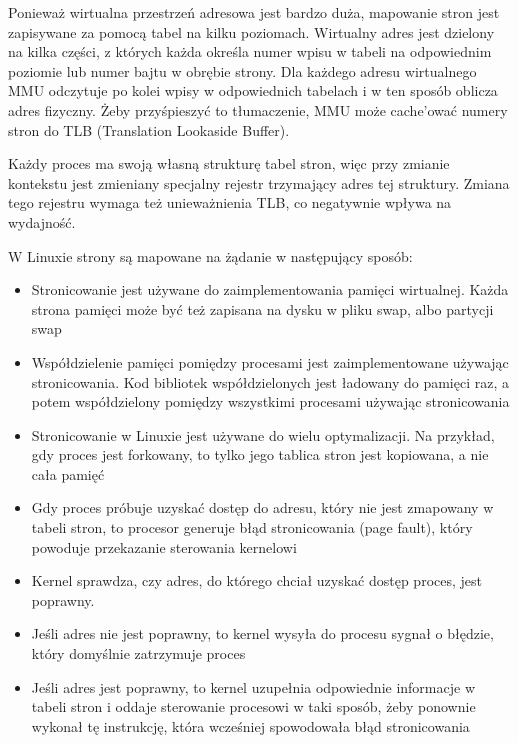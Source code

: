 Ponieważ wirtualna przestrzeń adresowa jest bardzo duża, mapowanie stron jest zapisywane za pomocą tabel na kilku poziomach. Wirtualny adres jest dzielony na kilka części, z których każda określa numer wpisu w tabeli na odpowiednim poziomie lub numer bajtu w obrębie strony. Dla każdego adresu wirtualnego MMU odczytuje po kolei wpisy w odpowiednich tabelach i w ten sposób oblicza adres fizyczny. Żeby przyśpieszyć to tłumaczenie, MMU może cache'ować numery stron do TLB (Translation Lookaside Buffer).

Każdy proces ma swoją własną strukturę tabel stron, więc przy zmianie kontekstu jest zmieniany specjalny rejestr trzymający adres tej struktury. Zmiana tego rejestru wymaga też unieważnienia TLB, co negatywnie wpływa na wydajność.

W Linuxie strony są mapowane na żądanie w następujący sposób:
\begin{itemize}
	\item Stronicowanie jest używane do zaimplementowania pamięci wirtualnej. Każda strona pamięci może być też zapisana na dysku w pliku swap, albo partycji swap
	\item Współdzielenie pamięci pomiędzy procesami jest zaimplementowane używając stronicowania. Kod bibliotek współdzielonych jest ładowany do pamięci raz, a potem współdzielony pomiędzy wszystkimi procesami używając stronicowania
	\item Stronicowanie w Linuxie jest używane do wielu optymalizacji. Na przykład, gdy proces jest forkowany, to tylko jego tablica stron jest kopiowana, a nie cała pamięć
	\item Gdy proces próbuje uzyskać dostęp do adresu, który nie jest zmapowany w tabeli stron, to procesor generuje błąd stronicowania (page fault), który powoduje przekazanie sterowania kernelowi
	\item Kernel sprawdza, czy adres, do którego chciał uzyskać dostęp proces, jest poprawny.
	\item Jeśli adres nie jest poprawny, to kernel wysyła do procesu sygnał o błędzie, który domyślnie zatrzymuje proces
	\item Jeśli adres jest poprawny, to kernel uzupełnia odpowiednie informacje w tabeli stron i oddaje sterowanie procesowi w taki sposób, żeby ponownie wykonał tę instrukcję, która wcześniej spowodowała błąd stronicowania
\end{itemize}